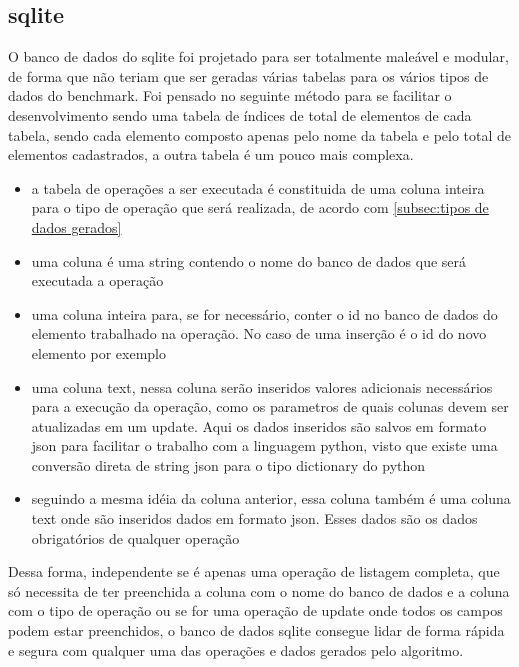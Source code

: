 \documentclass[
	12pt,				%
	openright,			%
	oneside,			%
	a4paper,			%
	english,			%
	french,				%
	spanish,			%
	brazil,				%
	]{abntex2}
\begin{document}
\subsection{sqlite}
\label{subsec:sqlite}
O banco de dados do sqlite foi projetado para ser totalmente maleável e modular, de forma que não teriam que ser geradas várias tabelas para os vários tipos de dados do benchmark. Foi pensado no seguinte método para se facilitar o desenvolvimento sendo uma tabela de índices de total de elementos de cada tabela, sendo cada elemento composto apenas pelo nome da tabela e pelo total de elementos cadastrados, a outra tabela é um pouco mais complexa.
\begin{itemize}
    \item a tabela de operações a ser executada é constituida de uma coluna inteira para o tipo de operação que será realizada, de acordo com \autoref{subsec:tipos de dados gerados}
    \item uma coluna é uma string contendo o nome do banco de dados que será executada a operação
    \item uma coluna inteira para, se for necessário, conter o id no banco de dados do elemento trabalhado na operação. No caso de uma inserção é o id do novo elemento por exemplo
    \item uma coluna text, nessa coluna serão inseridos valores adicionais necessários para a execução da operação, como os parametros de quais colunas devem ser atualizadas em um update. Aqui os dados inseridos são salvos em formato json para facilitar o trabalho com a linguagem python, visto que existe uma conversão direta de string json para o tipo dictionary do python
    \item seguindo a mesma idéia da coluna anterior, essa coluna também é uma coluna text onde são inseridos dados em formato json. Esses dados são os dados obrigatórios de qualquer operação
\end{itemize}
 Dessa forma, independente se é apenas uma operação de listagem completa, que só necessita de ter preenchida a coluna com o nome do banco de dados e a coluna com o tipo de operação ou se for uma operação de update onde todos os campos podem estar preenchidos, o banco de dados sqlite consegue lidar de forma rápida e segura com qualquer uma das operações e dados gerados pelo algoritmo.
\end{document}
